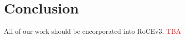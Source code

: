 \section{Conclusion}
\label{sec:conclusion}

All of our work should be encorporated into RoCEv3.
\textcolor{red}{TBA}
